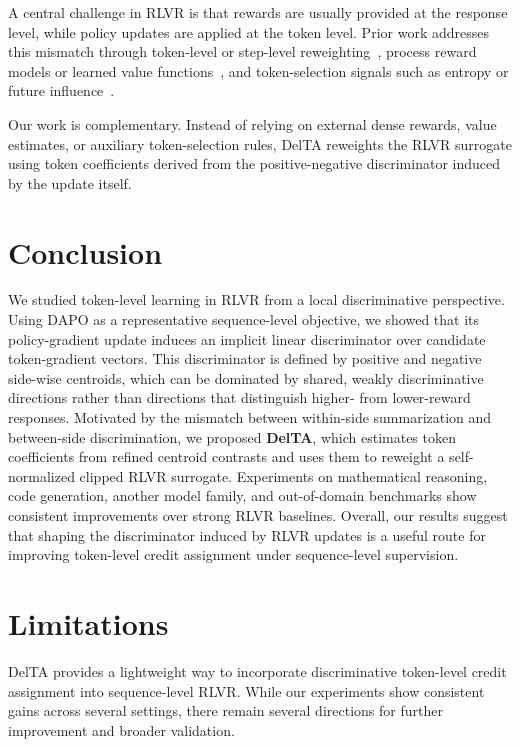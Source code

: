 \documentclass{article} %
\begin{document}
A central challenge in RLVR is that rewards are usually provided at the response level, while policy updates are applied at the token level. Prior work addresses this mismatch through token-level or step-level reweighting~\citep{kazemnejad2025vinepporefiningcreditassignment,xie2025capo}, process reward models or learned value functions~\citep{cui2025process,zhang2025lessons}, and token-selection signals such as entropy or future influence~\citep{wang2025beyond,ma2026fipo}. 

Our work is complementary. Instead of relying on external dense rewards, value estimates, or auxiliary token-selection rules, DelTA reweights the RLVR surrogate using token coefficients derived from the positive-negative discriminator induced by the update itself.

\section{Conclusion}
We studied token-level learning in RLVR from a local discriminative perspective.
Using DAPO as a representative sequence-level objective, we showed that its policy-gradient update induces an implicit linear discriminator over candidate token-gradient vectors.
This discriminator is defined by positive and negative side-wise centroids, which can be dominated by shared, weakly discriminative directions rather than directions that distinguish higher- from lower-reward responses.
Motivated by the mismatch between within-side summarization and between-side discrimination, we proposed \textbf{DelTA}, which estimates token coefficients from refined centroid contrasts and uses them to reweight a self-normalized clipped RLVR surrogate.
Experiments on mathematical reasoning, code generation, another model family, and out-of-domain benchmarks show consistent improvements over strong RLVR baselines.
Overall, our results suggest that shaping the discriminator induced by RLVR updates is a useful route for improving token-level credit assignment under sequence-level supervision.




\newpage
\appendix
\section{Limitations}
DelTA provides a lightweight way to incorporate discriminative token-level credit assignment into sequence-level RLVR. 
While our experiments show consistent gains across several settings, there remain several directions for further improvement and broader validation.
\end{document}
